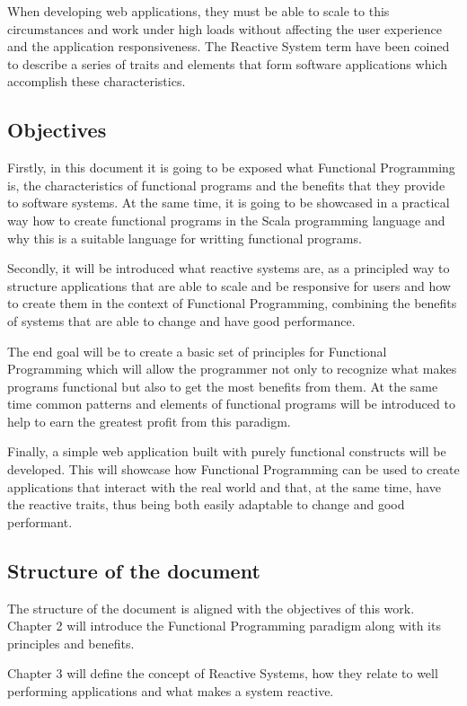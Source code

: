 \documentclass[../main.tex]{subfiles}
\begin{document}
When developing web applications, they must be able to scale to this
circumstances and work under high loads without affecting the user experience
and the application responsiveness. The Reactive System term have been coined to
describe a series of traits and elements that form software applications which
accomplish these characteristics.

\subsection{Objectives}
Firstly, in this document it is going to be exposed what Functional
Programming is, the characteristics of functional programs and the benefits that
they provide to software systems. At the same time, it is going to be showcased
in a practical way how to create functional programs in the Scala programming
language\autocite{TheLanguage} and why this is a suitable language for writting functional programs.

Secondly, it will be introduced what reactive systems are, as a principled way to
structure applications that are able to scale and be responsive for users and how to
create them in the context of Functional Programming, combining the benefits of
systems that are able to change and have good performance.

The end goal will be to create a basic set of principles for Functional
Programming which will allow the programmer not only to recognize what makes
programs functional but also to get the most benefits from them. At the same time common
patterns and elements of functional programs will be introduced to help to earn the
greatest profit from this paradigm.

Finally, a simple web application built with purely functional constructs will be
developed. This will showcase how Functional Programming can be used to create
applications that interact with the real world and that, at the same time, have
the reactive traits, thus being both easily adaptable to change and good performant.

\subsection{Structure of the document}
The structure of the document is aligned with the objectives of this work. Chapter 2
will introduce the Functional Programming paradigm along with its principles and
benefits.

Chapter 3 will define the concept of Reactive Systems, how they relate to
well performing applications and what makes a system reactive.
\end{document}
